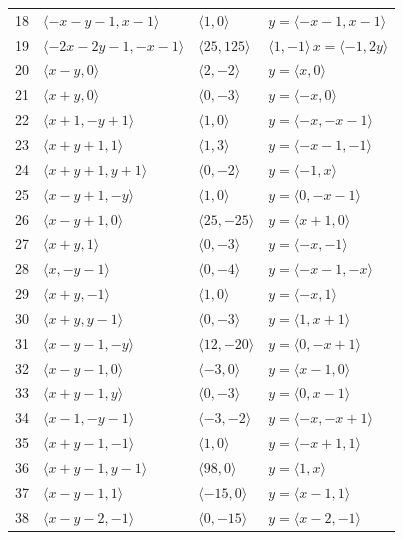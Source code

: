 \documentclass[11pt]{article}
\begin{document}
\begin{longtable}{@{}rlll@{}}
18 & $\langle -x-y-1,x-1\rangle$ & $\langle 1,0\rangle$ & $y=\langle -x-1,x-1\rangle$\\
19 & $\langle -2x-2y-1,-x-1\rangle$ & $\langle 25,125\rangle$ & $\langle 1,-1\rangle\,x=\langle -1,2y\rangle$\\
20 & $\langle x-y,0\rangle$ & $\langle 2,-2\rangle$ & $y=\langle x,0\rangle$\\
21 & $\langle x+y,0\rangle$ & $\langle 0,-3\rangle$ & $y=\langle -x,0\rangle$\\
22 & $\langle x+1,-y+1\rangle$ & $\langle 1,0\rangle$ & $y=\langle -x,-x-1\rangle$\\
23 & $\langle x+y+1,1\rangle$ & $\langle 1,3\rangle$ & $y=\langle -x-1,-1\rangle$\\
24 & $\langle x+y+1,y+1\rangle$ & $\langle 0,-2\rangle$ & $y=\langle -1,x\rangle$\\
25 & $\langle x-y+1,-y\rangle$ & $\langle 1,0\rangle$ & $y=\langle 0,-x-1\rangle$\\
26 & $\langle x-y+1,0\rangle$ & $\langle 25,-25\rangle$ & $y=\langle x+1,0\rangle$\\
27 & $\langle x+y,1\rangle$ & $\langle 0,-3\rangle$ & $y=\langle -x,-1\rangle$\\
28 & $\langle x,-y-1\rangle$ & $\langle 0,-4\rangle$ & $y=\langle -x-1,-x\rangle$\\
29 & $\langle x+y,-1\rangle$ & $\langle 1,0\rangle$ & $y=\langle -x,1\rangle$\\
30 & $\langle x+y,y-1\rangle$ & $\langle 0,-3\rangle$ & $y=\langle 1,x+1\rangle$\\
31 & $\langle x-y-1,-y\rangle$ & $\langle 12,-20\rangle$ & $y=\langle 0,-x+1\rangle$\\
32 & $\langle x-y-1,0\rangle$ & $\langle -3,0\rangle$ & $y=\langle x-1,0\rangle$\\
33 & $\langle x+y-1,y\rangle$ & $\langle 0,-3\rangle$ & $y=\langle 0,x-1\rangle$\\
34 & $\langle x-1,-y-1\rangle$ & $\langle -3,-2\rangle$ & $y=\langle -x,-x+1\rangle$\\
35 & $\langle x+y-1,-1\rangle$ & $\langle 1,0\rangle$ & $y=\langle -x+1,1\rangle$\\
36 & $\langle x+y-1,y-1\rangle$ & $\langle 98,0\rangle$ & $y=\langle 1,x\rangle$\\
37 & $\langle x-y-1,1\rangle$ & $\langle -15,0\rangle$ & $y=\langle x-1,1\rangle$\\
38 & $\langle x-y-2,-1\rangle$ & $\langle 0,-15\rangle$ & $y=\langle x-2,-1\rangle$\\

\end{longtable}
\end{document}
